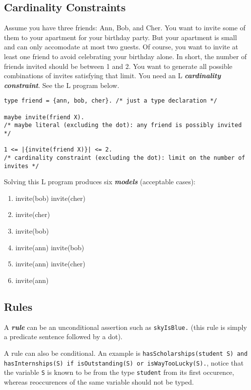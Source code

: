 \documentclass[letterpaper,10pt]{article}
\begin{document}
\begin{flushleft}
\subsection{Cardinality Constraints}

Assume you have three friends: Ann, Bob, and Cher. You want to invite some of them to your apartment for your birthday party. But your apartment is small and can only accomodate at most two guests. Of course, you want to invite at least one friend to avoid celebrating your birthday alone. In short, the number of friends invited should be between 1 and 2. You want to generate all possible combinations of invites satisfying that limit. You need an L \textbf{\textit{cardinality constraint}}. See the L program below.

\begin{verbatim}
type friend = {ann, bob, cher}. /* just a type declaration */

maybe invite(friend X). 
/* maybe literal (excluding the dot): any friend is possibly invited */

1 <= |{invite(friend X)}| <= 2. 
/* cardinality constraint (excluding the dot): limit on the number of invites */
\end{verbatim}

Solving this L program produces six \textbf{\textit{models}} (acceptable cases):
\begin{enumerate}
\item invite(bob) invite(cher)
\item invite(cher)
\item invite(bob)
\item invite(ann) invite(bob)
\item invite(ann) invite(cher)
\item invite(ann)
\end{enumerate}

\pagebreak

\subsection{Rules} \label{rl}

A \textbf{\textit{rule}} can be an unconditional assertion such as \texttt{skyIsBlue.} (this rule is simply a predicate sentence followed by a dot). 

A rule can also be conditional. An example is \texttt{hasScholarships(student S) and hasInternships(S) if isOutstanding(S) or isWayTooLucky(S).}, notice that the variable \texttt{S} is known to be from the type \texttt{student} from its first occurence, whereas reoccurences of the same variable should not be typed.


\end{flushleft}
\end{document}
